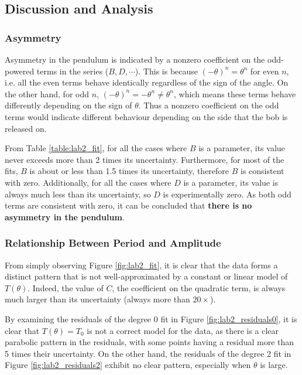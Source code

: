 \documentclass[aps,twocolumn,secnumarabic,nobalancelastpage,amsmath,amssymb,nofootinbib,floatfix,letterpaper]{revtex4}
\begin{document}
\subsection{Discussion and Analysis}

\subsubsection{Asymmetry}

Asymmetry in the pendulum is indicated by a nonzero coefficient on the odd-powered terms in the series (\(B, D, \cdots\)).
This is because \((-\theta)^n = \theta^n\) for even \(n\), i.e. all the even terms behave identically regardless of the
sign of the angle. On the other hand, for odd \(n\), \((-\theta)^n = -\theta^n \neq \theta^n\), which means these terms behave
differently depending on the sign of \(\theta\). Thus a nonzero coefficient on the odd terms would indicate different
behaviour depending on the side that the bob is released on.

From Table \ref{table:lab2_fit}, for all the cases where \(B\) is a parameter, its value never exceeds more than 2 times its
uncertainty. Furthermore, for most of the fits, \(B\) is about or less than 1.5 times its uncertainty, therefore
\(B\) is consistent with zero. Additionally, for all the cases where \(D\) is a parameter, its value is always much less
than its uncertainty, so \(D\) is experimentally zero. As both odd terms are consistent with zero, it can be
concluded that \textbf{there is no asymmetry in the pendulum}.

\subsubsection{Relationship Between Period and Amplitude}
\label{sec:lab2_relationship}

From simply observing Figure \ref{fig:lab2_fit}, it is clear that the data forms a distinct pattern that is not
well-approximated by a constant or linear model of \(T(\theta)\). Indeed, the value of \(C\), the coefficient on the
quadratic term, is always much larger than its uncertainty (always more than \(20 \times\)).

By examining the residuals of the degree 0 fit in Figure \ref{fig:lab2_residuals0}, it is clear that \(T(\theta) = T_0\)
is not a correct model for the data, as there is a clear parabolic pattern in the residuals, with some points having a
residual more than 5 times their uncertainty. On the other hand, the residuals of the degree 2 fit in Figure
\ref{fig:lab2_residuals2} exhibit no clear pattern, especially when \(\theta\) is large.
\end{document}
